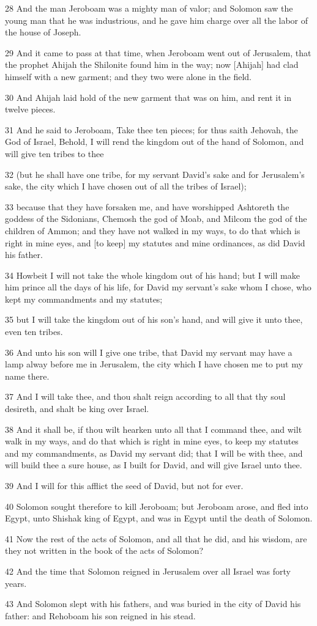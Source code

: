 \par 28 And the man Jeroboam was a mighty man of valor; and Solomon saw the young man that he was industrious, and he gave him charge over all the labor of the house of Joseph.
\par 29 And it came to pass at that time, when Jeroboam went out of Jerusalem, that the prophet Ahijah the Shilonite found him in the way; now [Ahijah] had clad himself with a new garment; and they two were alone in the field.
\par 30 And Ahijah laid hold of the new garment that was on him, and rent it in twelve pieces.
\par 31 And he said to Jeroboam, Take thee ten pieces; for thus saith Jehovah, the God of Israel, Behold, I will rend the kingdom out of the hand of Solomon, and will give ten tribes to thee
\par 32 (but he shall have one tribe, for my servant David's sake and for Jerusalem's sake, the city which I have chosen out of all the tribes of Israel);
\par 33 because that they have forsaken me, and have worshipped Ashtoreth the goddess of the Sidonians, Chemosh the god of Moab, and Milcom the god of the children of Ammon; and they have not walked in my ways, to do that which is right in mine eyes, and [to keep] my statutes and mine ordinances, as did David his father.
\par 34 Howbeit I will not take the whole kingdom out of his hand; but I will make him prince all the days of his life, for David my servant's sake whom I chose, who kept my commandments and my statutes;
\par 35 but I will take the kingdom out of his son's hand, and will give it unto thee, even ten tribes.
\par 36 And unto his son will I give one tribe, that David my servant may have a lamp alway before me in Jerusalem, the city which I have chosen me to put my name there.
\par 37 And I will take thee, and thou shalt reign according to all that thy soul desireth, and shalt be king over Israel.
\par 38 And it shall be, if thou wilt hearken unto all that I command thee, and wilt walk in my ways, and do that which is right in mine eyes, to keep my statutes and my commandments, as David my servant did; that I will be with thee, and will build thee a sure house, as I built for David, and will give Israel unto thee.
\par 39 And I will for this afflict the seed of David, but not for ever.
\par 40 Solomon sought therefore to kill Jeroboam; but Jeroboam arose, and fled into Egypt, unto Shishak king of Egypt, and was in Egypt until the death of Solomon.
\par 41 Now the rest of the acts of Solomon, and all that he did, and his wisdom, are they not written in the book of the acts of Solomon?
\par 42 And the time that Solomon reigned in Jerusalem over all Israel was forty years.
\par 43 And Solomon slept with his fathers, and was buried in the city of David his father: and Rehoboam his son reigned in his stead.

